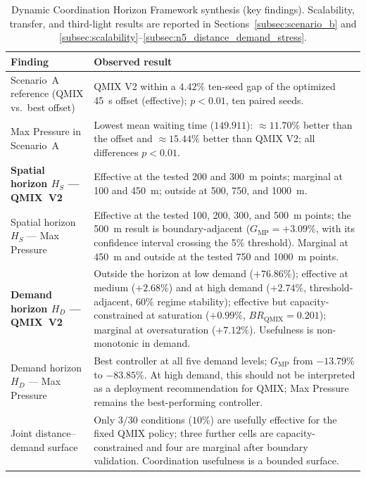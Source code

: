 \documentclass[review,12pt]{elsarticle}
\renewcommand{\arraystretch}{1.15}
\begin{document}
\begin{table}[!htbp]
\centering
\caption{Dynamic Coordination Horizon Framework synthesis (key findings).
Scalability, transfer, and third-light results are reported in
Sections~\ref{subsec:scenario_b} and
\ref{subsec:scalability}--\ref{subsec:n5_distance_demand_stress}.}
\label{tab:dchf_key_findings}
\begingroup
\small
\setlength{\tabcolsep}{4pt}
\renewcommand{\arraystretch}{1.05}
\begin{tabularx}{\textwidth}{@{}>{\raggedright\arraybackslash}p{4.1cm}X@{}}
\toprule
\textbf{Finding} & \textbf{Observed result} \\
\midrule
Scenario~A reference (QMIX vs.\ best offset) &
  QMIX V2 within a $4.42\%$ ten-seed gap of the optimized 45~s offset
  (effective); $p<0.01$, ten paired seeds. \\
Max Pressure in Scenario~A &
  Lowest mean waiting time ($149.911$): $\approx 11.70\%$ better than the
  offset and $\approx 15.44\%$ better than QMIX V2; all differences $p<0.01$. \\
\textbf{Spatial horizon $H_S$ --- QMIX~V2} &
  Effective at the tested 200 and 300~m points; marginal at 100 and 450~m;
  outside at 500, 750, and 1000~m. \\
Spatial horizon $H_S$ --- Max Pressure &
  Effective at the tested 100, 200, 300, and 500~m points; the 500~m result
  is boundary-adjacent ($G_{\mathrm{MP}}=+3.09\%$, with its confidence
  interval crossing the 5\% threshold). Marginal at 450~m and outside at the
  tested 750 and 1000~m points. \\
\textbf{Demand horizon $H_D$ --- QMIX~V2} &
  Outside the horizon at low demand ($+76.86\%$); effective at medium
  ($+2.68\%$) and at high demand ($+2.74\%$, threshold-adjacent, $60\%$
  regime stability); effective but capacity-constrained at saturation
  ($+0.99\%$, $BR_{\mathrm{QMIX}}=0.201$); marginal at oversaturation
  ($+7.12\%$). Usefulness is non-monotonic in demand. \\
Demand horizon $H_D$ --- Max Pressure &
  Best controller at all five demand levels; $G_{\mathrm{MP}}$ from
  $-13.79\%$ to $-83.85\%$. At high demand, this should not be interpreted
  as a deployment recommendation for QMIX; Max Pressure remains the
  best-performing controller. \\
Joint distance--demand surface &
  Only $3/30$ conditions ($10\%$) are usefully effective for the fixed QMIX
  policy; three further cells are capacity-constrained and four are marginal
  after boundary validation. Coordination usefulness is a bounded surface. \\
\bottomrule
\end{tabularx}
\endgroup
\end{table}
\end{document}
